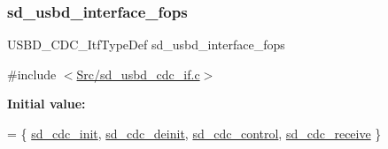 \subsubsection{\texorpdfstring{sd\+\_\+usbd\+\_\+interface\+\_\+fops}{sd\_usbd\_interface\_fops}}
{\footnotesize\ttfamily U\+S\+B\+D\+\_\+\+C\+D\+C\+\_\+\+Itf\+Type\+Def sd\+\_\+usbd\+\_\+interface\+\_\+fops}



{\ttfamily \#include $<$\mbox{\hyperlink{sd__usbd__cdc__if_8c}{Src/sd\+\_\+usbd\+\_\+cdc\+\_\+if.\+c}}$>$}

{\bfseries Initial value\+:}
\begin{DoxyCode}
= \{
    \mbox{\hyperlink{group___s_d___u_s_b___c_d_c___i_f___functions_ga9acc365b136914ed8a39593ee02d0260}{sd\_cdc\_init}},
    \mbox{\hyperlink{group___s_d___u_s_b___c_d_c___i_f___functions_gad9f46346272b91f23250ef22b6a1e600}{sd\_cdc\_deinit}},
    \mbox{\hyperlink{group___s_d___u_s_b___c_d_c___i_f___functions_ga7c03942883325c01bc3fd6410d4d1911}{sd\_cdc\_control}},  
    \mbox{\hyperlink{group___s_d___u_s_b___c_d_c___i_f___functions_ga5da74bc52d86c1f85d057f7df7d7674a}{sd\_cdc\_receive}}
\}
\end{DoxyCode}
